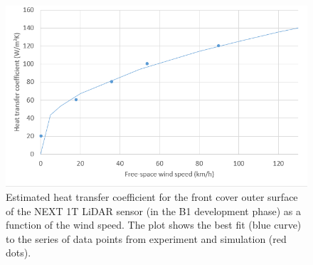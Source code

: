 \begin{figure} [H]
	\centering
	\includegraphics[scale=0.6]{Pictures/htc-v.png}
	\caption[Heat Transfer Coefficient vs Wind Speed]{Estimated heat transfer coefficient for the front cover outer surface of the NEXT 1T LiDAR sensor (in the B1 development phase) as a function of the wind speed. The plot shows the best fit (blue curve) to the series of data points from experiment and simulation (red dots).}
	\label{fig:HTC}
\end{figure}


%

